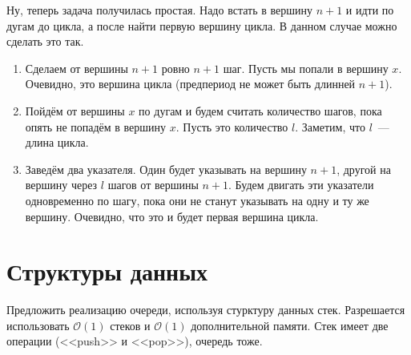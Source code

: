 \documentclass[addpoints]{exam}
\renewcommand{\O}[1]{\mathcal{O}(#1)}
\begin{document}
\begin{questions}
\begin{solution}
Ну, теперь задача получилась простая. Надо встать в вершину $n+1$ и идти по дугам до цикла, а после найти первую вершину цикла. В данном случае можно сделать это так.

\begin{enumerate}

\item Сделаем от вершины $n+1$ ровно $n+1$ шаг. Пусть мы попали в вершину $x$. Очевидно, это вершина цикла (предпериод не может быть длинней $n+1$).

\item Пойдём от вершины $x$ по дугам и будем считать количество шагов, пока опять не попадём в вершину $x$. Пусть это количество $l$. Заметим, что $l$~--- длина цикла. 

\item Заведём два указателя. Один будет указывать на вершину $n+1$, другой на вершину через $l$ шагов от вершины $n+1$. Будем двигать эти указатели одновременно по шагу, пока они не станут указывать на одну и ту же вершину. Очевидно, что это и будет первая вершина цикла.

\end{enumerate}

\end{solution}

\section{Структуры данных}

\question Предложить реализацию очереди, используя стурктуру данных стек. Разрешается использовать $\mathcal{O}(1)$ стеков и $\mathcal{O}(1)$ дополнительной памяти. Стек имеет две операции (<<push>> и <<pop>>), очередь тоже.


\begin{solution}


\end{solution}
\end{questions}
\end{document}
